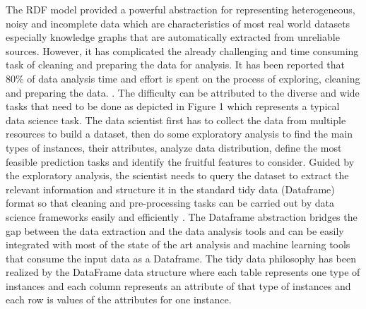 The RDF model provided a powerful abstraction for representing heterogeneous, noisy and incomplete data  which are characteristics of most real world datasets especially knowledge graphs that are automatically extracted from unreliable sources. However, it has complicated the already challenging and time consuming task of cleaning and preparing the data for analysis. It has been reported that $80\%$ of data analysis time and effort is spent on the process of exploring, cleaning and preparing the data.  \cite{dasu2003exploratory}. %
The difficulty can be attributed to the diverse and wide tasks that need to be done as depicted in Figure 1 which represents a typical data science task. The data scientist first has to collect the data from multiple resources to build a dataset, then do some exploratory analysis to find the main types of instances, their attributes, analyze data distribution, define the most feasible prediction tasks and identify the fruitful features to consider. Guided by the exploratory analysis, the scientist needs to query the dataset to extract the relevant information and structure it in the standard tidy data (Dataframe) format so that cleaning and pre-processing tasks can be carried out by data science frameworks easily and efficiently \cite{tidydata}. The Dataframe abstraction bridges the gap between the data extraction and the data analysis tools and can be easily integrated with most of the state of the art analysis and machine learning tools that consume the input data as a Dataframe. The tidy data philosophy has been realized by the DataFrame data structure where each table represents one type of instances and each column represents an attribute of that type of instances and each row is values of the attributes for one instance.

